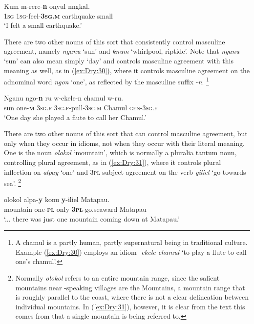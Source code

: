 \documentclass[output=collectionpaper]{langsci/langscibook}
\begin{document}
\ea \label{ex:Dry:29}
\gll Kum	m-rere-\textbf{n}	onyul	nngkal.\\
\textsc{1sg} \textsc{1sg}-feel-\textbf{\textsc{3sg.m}} earthquake small\\
\glt `I felt a small earthquake.'
\z

There are two other nouns of this sort that consistently control masculine agreement, namely \textit{nganu} `sun' and \textit{knum} `whirlpool, riptide'. Note that \textit{nganu} `sun' can also mean simply `day' and controls masculine agreement with this meaning as well, as in (\ref{ex:Dry:30}), where it controls masculine agreement on the adnominal word \textit{ngon} `one', as reflected by the masculine suffix -\textit{n}.%
\footnote{A chamul is a partly human, partly supernatural being in traditional  culture. Example (\ref{ex:Dry:30}) employs an idiom \textit{{}-ekele chamul} `to play a flute to call one's chamul'.}

\ea \label{ex:Dry:30}
\gll Nganu	ngo-\textbf{n}	ru	w-ekele-n	chamul w-ru.\\
sun one-\textbf{\textsc{m}} \textsc{3sg.f} \textsc{3sg.f}-pull-\textsc{3sg.m} Chamul \textsc{gen}-\textsc{3sg.f}\\
\glt `One day she played a flute to call her Chamul.'
\z

There are two other nouns of this sort that can control masculine agreement, but only when they occur in idioms, not when they occur with their literal meaning. One is the noun \textit{olokol} `mountain', which is normally a pluralia tantum noun, controlling plural agreement, as in (\ref{ex:Dry:31}), where it controls plural inflection on \textit{alpay} `one' and \textsc{3pl} subject agreement on the verb \textit{yiliel} `go towards sea'.%
\footnote{Normally \textit{olokol} refers to an entire mountain range, since the salient mountains near -speaking villages are the  Mountains, a mountain range that is roughly parallel to the coast, where there is not a clear delineation between individual mountains. In (\ref{ex:Dry:31}), however, it is clear from the text this comes from that a single mountain is being referred to.}

\ea \label{ex:Dry:31}
\gll {\ldots}	olokol	alpa-\textbf{y}	konu	\textbf{y}-iliel	Matapau. \\
{} mountain one-\textbf{\textsc{pl}} only \textbf{\textsc{3pl}}-go.seaward Matapau\\
\glt `... there was just one mountain coming down at Matapau.'
\z
\end{document}
